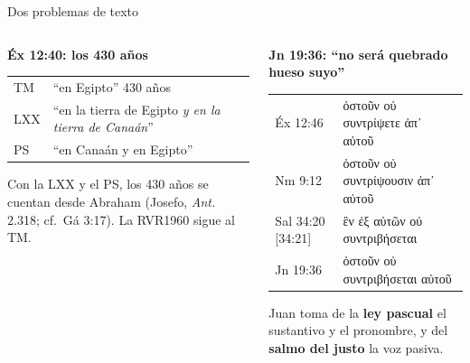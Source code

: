 \documentclass[hyperref={bookmarks=false},aspectratio=169]{beamer}
\newcommand{\grc}[1]{\foreignlanguage{ancientgreek}{#1}}
\newcommand{\destacar}[1]{\textbf{\textcolor{tierraroja}{#1}}}
\begin{document}
\begin{frame}{Dos problemas de texto}
\begin{columns}[t,onlytextwidth]
\begin{column}{0.48\textwidth}
\textbf{\small\textcolor{tierraroja}{Éx 12:40: los 430 años}}\par\smallskip
\scriptsize\renewcommand{\arraystretch}{1.12}
\begin{tabular}{@{}L{1.3cm}L{4.1cm}@{}}
\toprule
TM & ``en Egipto'' 430 años \\
LXX & ``en la tierra de Egipto \emph{y en la tierra de Canaán}'' \\
PS & ``en Canaán y en Egipto'' \\
\bottomrule
\end{tabular}\par\smallskip
\RaggedRight Con la LXX y el PS, los 430 años se cuentan desde Abraham (Josefo, \emph{Ant.} 2.318; cf.\ Gá 3:17). La RVR1960 sigue al TM.
\end{column}
\begin{column}{0.50\textwidth}
\textbf{\small\textcolor{tierraroja}{Jn 19:36: ``no será quebrado hueso suyo''}}\par\smallskip
\scriptsize\renewcommand{\arraystretch}{1.12}
\begin{tabular}{@{}L{1.7cm}L{4.1cm}@{}}
\toprule
Éx 12:46 & \grc{ὀστοῦν οὐ συντρίψετε ἀπ᾿ αὐτοῦ} \\
Nm 9:12 & \grc{ὀστοῦν οὐ συντρίψουσιν ἀπ᾿ αὐτοῦ} \\
Sal 34:20 [34:21] & \grc{ἓν ἐξ αὐτῶν οὐ συντριβήσεται} \\
Jn 19:36 & \grc{ὀστοῦν οὐ συντριβήσεται αὐτοῦ} \\
\bottomrule
\end{tabular}\par\smallskip
\RaggedRight Juan toma de la \destacar{ley pascual} el sustantivo y el pronombre, y del \destacar{salmo del justo} la voz pasiva.
\end{column}
\end{columns}
\end{frame}
\end{document}
